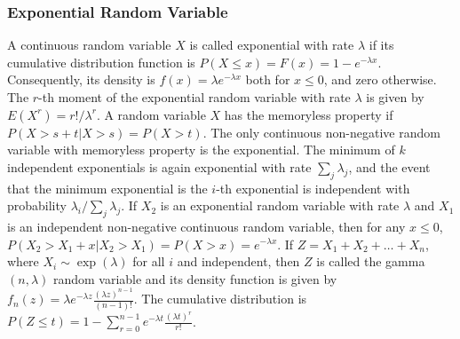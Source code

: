 \subsubsection*{Exponential Random Variable}
 A continuous random variable $X$ is called exponential with rate $\lambda$ if its cumulative distribution function is $P(X \le x) = F(x) = 1-e^{-\lambda x}$. Consequently, its density is $f(x) = \lambda e^{-\lambda x}$ both for $x \le 0$, and zero otherwise.
 The $r$-th moment of the exponential random variable with rate $\lambda$ is given by $E(X^r) = r!/\lambda^r$.
 A random variable $X$ has the memoryless property if 
$P(X > s + t | X> s) = P(X > t)$.
 The only continuous non-negative random variable with memoryless property is the exponential.
 The minimum of $k$ independent exponentials is again exponential with rate $\sum_j \lambda_j$, and the event that the minimum exponential is the $i$-th exponential is independent with probability $\lambda_i/\sum_j\lambda_j$.
 If $X_2$ is an exponential random variable with rate $\lambda$ and $X_1$ is an independent non-negative continuous random variable, then for any $x \le 0$, $P(X_2 > X_1 +x|X_2 > X_1) = P(X > x) = e^{-\lambda x}$.
 If $Z = X_1 + X_2 + \ldots + X_n$, where $X_i \sim \exp(\lambda)$ for all $i$ and independent, then $Z$ is called the gamma $(n, \lambda)$ random variable and its density function is given by $f_n(z) = \lambda e^{-\lambda z} \frac{(\lambda z)^{n-1}}{(n-1)!}$. The cumulative distribution is 
$P(Z \le t) = 1 - \sum^{n-1}_{r=0} e^{-\lambda t} \frac{(\lambda t)^r}{r!}$.